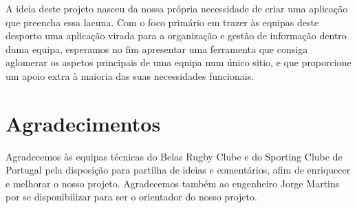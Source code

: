 \documentclass[a4paper,openright,twoside,11pt]{report}
\begin{document}
A ideia deste projeto nasceu da nossa própria necessidade de criar uma aplicação que preencha essa lacuna. Com o foco primário em trazer às equipas deste desporto uma aplicação virada para a organização e gestão de informação dentro duma equipa, esperamos no fim apresentar uma ferramenta que consiga aglomerar os aspetos principais de uma equipa num único sitio, e que proporcione um apoio extra à maioria das suas necessidades funcionais.


\cleardoublepage
\chapter*{Agradecimentos}
Agradecemos às equipas técnicas do Belas Rugby Clube e do Sporting Clube de Portugal pela disposição para partilha de ideias e comentários, afim de enriquecer e melhorar o nosso projeto. Agradecemos também ao engenheiro Jorge Martins por se disponibilizar para ser o orientador do nosso projeto.

\cleardoublepage
\tableofcontents \cleardoublepage


\setcounter{page}{1}
















\appendix

\end{document}
